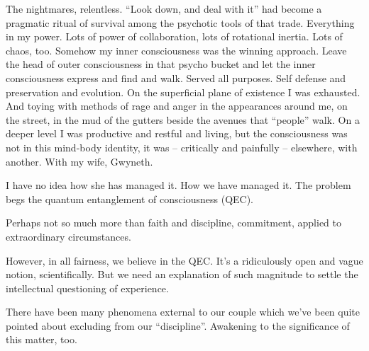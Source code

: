 

﻿The nightmares, relentless.  ``Look down, and deal with it'' had
become a pragmatic ritual of survival \break among the psychotic tools of
that trade.  Everything in my power.  Lots of power of collaboration,
lots of rotational inertia.  Lots of chaos, too.  Somehow my inner
consciousness was the winning approach.  Leave the head of outer
consciousness in that psycho bucket and let the inner consciousness
express and find and walk.  Served all purposes.  Self defense and
preservation and evolution.  On the superficial plane of existence I
was exhausted.  And toying with methods of rage and anger in the
appearances around me, on the street, in the mud of the gutters beside
the avenues that ``people'' walk.  On a deeper level I was productive
and restful and living, but the consciousness was not in this
mind-body identity, it was -- critically and painfully -- elsewhere,
with another.  With my wife, Gwyneth.


I have no idea how she has managed it.  How we have managed it.  The
problem begs the quantum entanglement of consciousness (QEC).


Perhaps not so much more than faith and discipline, commitment,
applied to extraordinary circumstances.


However, in all fairness, we believe in the QEC.  It's a ridiculously
open and vague notion, scientifically.  But we need an explanation of
such magnitude to settle the intellectual questioning of experience.


There have been many phenomena external to our couple which we've been
quite pointed about excluding from our ``discipline''.  Awakening to
the significance of this matter, too.

\bye
